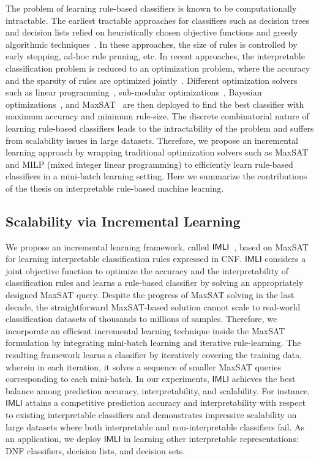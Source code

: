 The problem of learning rule-based classifiers is known to be computationally intractable. The earliest tractable approaches for classifiers such as decision trees and decision lists relied on heuristically chosen objective functions and greedy algorithmic techniques~\cite{ClarkN1989,CohenS1999,quinlan2014}. In these approaches, the size of rules is controlled by early stopping,  ad-hoc rule pruning, etc. In recent approaches, the interpretable classification problem is reduced to an optimization problem, where the accuracy and the sparsity of rules are optimized jointly~\cite{lakkaraju2016interpretable,narodytska2018learning}. Different optimization solvers such as linear programming~\cite{malioutov2013exact}, sub-modular optimizations~\cite{lakkaraju2016interpretable}, Bayesian optimizations~\cite{letham2015interpretable}, and MaxSAT~\cite{malioutov2018mlic} are then deployed to find the best classifier with maximum accuracy and minimum rule-size. The discrete combinatorial nature of learning rule-based classifiers leads to the intractability of the problem and suffers from scalability issues in large datasets. Therefore, we propose an incremental learning approach by wrapping traditional optimization solvers such as MaxSAT and MILP (mixed integer linear programming) to efficiently learn rule-based classifiers in a mini-batch learning setting.  Here we summarize the contributions of the thesis on interpretable rule-based machine learning.

\subsection*{Scalability via Incremental Learning}
We propose an incremental learning framework, called $ \mathsf{IMLI} $~\cite{GMM2022,GM2019},  based on MaxSAT for learning interpretable classification rules expressed in CNF. $ \mathsf{IMLI} $ considers a joint objective function to optimize the accuracy and the interpretability of classification rules and learns a rule-based classifier by solving an appropriately designed MaxSAT query. Despite the progress of MaxSAT solving in the last decade, the straightforward MaxSAT-based solution cannot scale to real-world classification datasets of thousands to millions of samples. Therefore, we incorporate an efficient incremental learning technique inside the MaxSAT formulation by integrating mini-batch learning and iterative rule-learning. The resulting framework learns a classifier by iteratively covering the training data, wherein in each iteration, it solves a sequence of smaller MaxSAT queries corresponding to each mini-batch. In our experiments, $ \mathsf{IMLI} $ achieves the best balance among prediction accuracy, interpretability, and scalability. For instance, $ \mathsf{IMLI} $ attains a competitive prediction accuracy and interpretability with respect to existing interpretable classifiers and demonstrates impressive scalability on large datasets where both interpretable and non-interpretable classifiers fail. As an application, we deploy $ \mathsf{IMLI} $ in learning other interpretable representations: DNF classifiers, decision lists, and decision sets.
	
